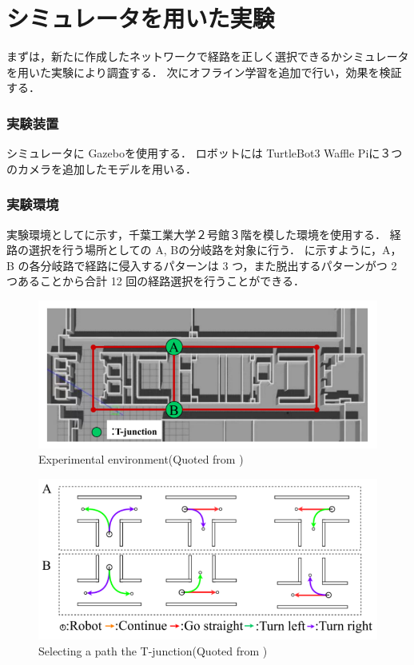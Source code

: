 \section{シミュレータを用いた実験}
まずは，新たに作成したネットワークで経路を正しく選択できるかシミュレータを用いた実験により調査する．
次にオフライン学習を追加で行い，効果を検証する．

\subsubsection{実験装置}
シミュレータに Gazebo\cite{gazebo}を使用する．
ロボットには TurtleBot3 Waffle Pi\cite{turtlebot3}に３つのカメラを追加したモデルを用いる．

\subsubsection{実験環境}
実験環境としてに示す，千葉工業大学２号館３階を模した環境を使用する．
経路の選択を行う場所としての A, Bの分岐路を対象に行う．
に示すように，A，B の各分岐路で経路に侵入するパターンは 3 つ，また脱出するパターンがつ 2 つあることから合計 12 回の経路選択を行うことができる．

\begin{figure}
  \centering
  \includegraphics[width=130mm]{images/pdf/haruyama/cit3f.pdf}
  \caption[Experimental environment]{Experimental environment(Quoted from \cite{haruyama2022})}
  \label{fig:haruyama_cit3f}
\end{figure}

\begin{figure}
  \centering
  \includegraphics[width=130mm]{images/pdf/haruyama/select_pattern.pdf}
  \caption[Selecting a path the T-junction]{Selecting a path the T-junction(Quoted from \cite{haruyama2022})}
  \label{fig:select_pattern}
\end{figure}
 
